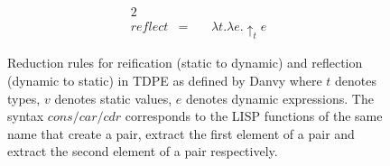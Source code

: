 \documentclass[a4paper,12pt,twoside,openright]{report}
\theoremstyle{definition}
\begin{document}
\begin{figure}[htp!]
\begin{alignat}{2}
        \nonumber \\%
        \mathit{reflect} & = \: && \lambda t. \lambda e. \uparrow_{t} e
    \end{alignat}
    \caption{Reduction rules for reification (static to dynamic) and reflection (dynamic to static) in TDPE as defined by Danvy \cite{danvy1999type} where $t$ denotes types, $v$ denotes static values, $e$ denotes dynamic expressions. The syntax $cons/car/cdr$ corresponds to the LISP functions of the same name that create a pair, extract the first element of a pair and extract the second element of a pair respectively.}
    \label{fig:tdpe_rules}
\end{figure}
\newpage

%
%
%
\end{document}
